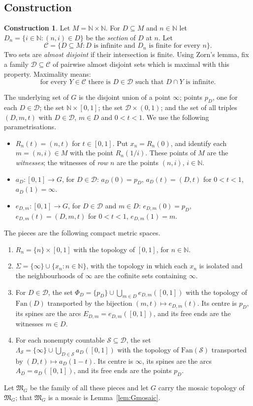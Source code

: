 \documentclass[11pt]{amsart}
\theoremstyle{definition}
\newtheorem{construction}[theorem]{Construction}
\theoremstyle{remark}
\newcommand{\N}{\mathbb{N}}
\newcommand{\cD}{\mathcal{D}}
\newcommand{\cC}{\mathcal{C}}
\newcommand{\cS}{\mathcal{S}}
\newcommand{\fM}{\mathfrak{M}}
\numberwithin{equation}{section}
\begin{document}
\subsection{Construction}
\begin{construction}\label{con:G}
Let $M=\N\times\N$. For $D\subseteq M$ and $n\in\N$ let $D_n=\{i\in\N:(n,i)\in D\}$ be the \emph{section} of $D$ at $n$. Let
\[\cC=\{D\subseteq M:D\text{ is infinite and }D_n\text{ is finite for every }n\}.\]
Two sets are \emph{almost disjoint} if their intersection is finite. Using Zorn's lemma, fix a family $\cD\subseteq\cC$ of pairwise almost disjoint sets which is maximal with this property. Maximality means:
\begin{equation}\label{eq:max}
\text{for every }Y\in\cC\text{ there is }D\in\cD\text{ such that }D\cap Y\text{ is infinite.}
\end{equation}

The underlying set of $G$ is the disjoint union of a point $\infty$; points $p_D$, one for each $D\in\cD$; the set $\N\times[0,1]$; the set $\cD\times(0,1)$; and the set of all triples $(D,m,t)$ with $D\in\cD$, $m\in D$ and $0<t<1$. We use the following parametrisations.
\begin{itemize}[leftmargin=2em]
\item $R_n(t)=(n,t)$ for $t\in[0,1]$. Put $x_n=R_n(0)$, and identify each $m=(n,i)\in M$ with the point $R_n(1/i)$. These points of $M$ are the \emph{witnesses}; the witnesses of \emph{row $n$} are the points $(n,i)$, $i\in\N$.
\item $a_D\colon[0,1]\to G$, for $D\in\cD$: $a_D(0)=p_D$, $a_D(t)=(D,t)$ for $0<t<1$, $a_D(1)=\infty$.
\item $e_{D,m}\colon[0,1]\to G$, for $D\in\cD$ and $m\in D$: $e_{D,m}(0)=p_D$, $e_{D,m}(t)=(D,m,t)$ for $0<t<1$, $e_{D,m}(1)=m$.
\end{itemize}
The pieces are the following compact metric spaces.
\begin{enumerate}[label=\textup{(P\arabic*)}]
\item $R_n=\{n\}\times[0,1]$ with the topology of $[0,1]$, for $n\in\N$.
\item $\Sigma=\{\infty\}\cup\{x_n:n\in\N\}$, with the topology in which each $x_n$ is isolated and the neighbourhoods of $\infty$ are the cofinite sets containing $\infty$.
\item For $D\in\cD$, the set $\Phi_D=\{p_D\}\cup\bigcup_{m\in D}e_{D,m}([0,1])$ with the topology of $\mathrm{Fan}(D)$ transported by the bijection $(m,t)\mapsto e_{D,m}(t)$. Its centre is $p_D$, its spines are the arcs $E_{D,m}=e_{D,m}([0,1])$, and its free ends are the witnesses $m\in D$.
\item For each nonempty countable $\cS\subseteq\cD$, the set $\Lambda_\cS=\{\infty\}\cup\bigcup_{D\in\cS}a_D([0,1])$ with the topology of $\mathrm{Fan}(\cS)$ transported by $(D,t)\mapsto a_D(1-t)$. Its centre is $\infty$, its spines are the arcs $A_D=a_D([0,1])$, and its free ends are the points $p_D$.
\end{enumerate}
Let $\fM_G$ be the family of all these pieces and let $G$ carry the mosaic topology of $\fM_G$; that $\fM_G$ is a mosaic is Lemma~\ref{lem:Gmosaic}.
\end{construction}
\end{document}
